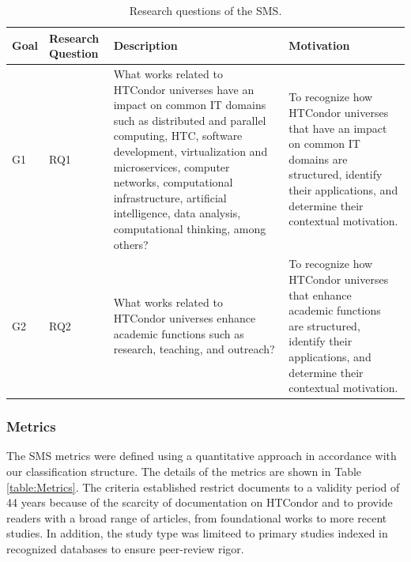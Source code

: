 \begin{table}[htbp]
	\centering
	\caption{Research questions of the SMS.}
	\label{table:RQs}
	\renewcommand{\arraystretch}{1}  %
	\begin{tabular}{p{1cm}p{1.7cm}p{6.8cm}p{6.8cm}}
		\toprule
		\textbf{Goal} & \textbf{Research Question} & \textbf{Description}                                                                                                                                                                                                                                                                                                 & \textbf{Motivation}                                                                                                                                                  \\
		\midrule
		G1            & RQ1                        & What works related to HTCondor universes have an impact on common IT domains such as distributed and parallel computing, HTC, software development, virtualization and microservices, computer networks, computational infrastructure, artificial intelligence, data analysis, computational thinking, among others? & To recognize how HTCondor universes that have an impact on common IT domains are structured, identify their applications, and determine their contextual motivation. \\
		\addlinespace[0.8em]
		G2            & RQ2                        & What works related to HTCondor universes enhance academic functions such as research, teaching, and outreach?                                                                                                                                                                                                        & To recognize how HTCondor universes that enhance academic functions are structured, identify their applications, and determine their contextual motivation.          \\
		\bottomrule
	\end{tabular}
\end{table}

\subsubsection{Metrics}
The SMS metrics were defined using a quantitative approach in accordance with our classification structure. The details of the metrics are shown in Table \ref{table:Metrics}. The criteria established restrict documents to a validity period of 44 years because of the scarcity of documentation on HTCondor and to provide readers with a broad range of articles, from foundational works to more recent studies. In addition, the study type was limiteed to primary studies indexed in recognized databases to ensure peer-review rigor.

